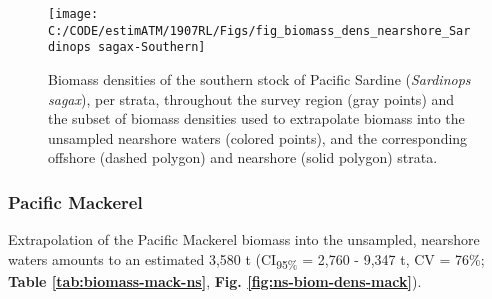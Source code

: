 \documentclass[]{article}
\begin{document}
\newpage



\begin{figure}[H]

{\centering \texttt{[image: C:/CODE/estimATM/1907RL/Figs/fig\_biomass\_dens\_nearshore\_Sardinops sagax-Southern]} 

}

\caption{Biomass densities of the southern stock of Pacific Sardine (\emph{Sardinops sagax}), per strata, throughout the survey region (gray points) and the subset of biomass densities used to extrapolate biomass into the unsampled nearshore waters (colored points), and the corresponding offshore (dashed polygon) and nearshore (solid polygon) strata.}\label{fig:ns-biom-dens-sar-s}
\end{figure}

\newpage

\hypertarget{appendix-nearshore-biomass-mack}{%
\subsubsection{Pacific Mackerel}\label{appendix-nearshore-biomass-mack}}

Extrapolation of the Pacific Mackerel biomass into the unsampled, nearshore waters amounts to an estimated 3,580 t (CI\textsubscript{95\%} = 2,760 - 9,347 t, CV = 76\%; \textbf{Table \ref{tab:biomass-mack-ns}}, \textbf{Fig. \ref{fig:ns-biom-dens-mack}}).



\begin{table}[!h]

\caption{\label{tab:biomass-mack-ns}Biomass estimates (metric tons, t) and their precision (upper and lower 95\% confidence intervals, CI\textsubscript{95\%}; standard deviation, SD; and coefficient of variation, CV) for Pacific Mackerel (\emph{Scomber japonicus}) in the unsampled, nearshore waters. Stratum areas are nmi\textsuperscript{2}.}
\centering
{}
\end{table}
\end{document}
